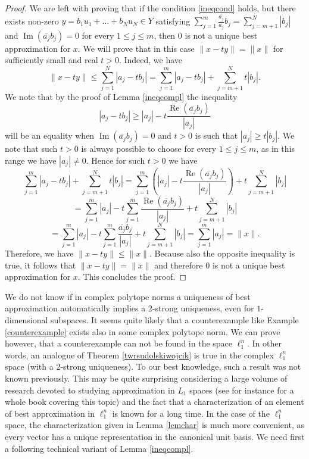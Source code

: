 \documentclass[12pt, reqno]{amsart}
\theoremstyle{definition}
\theoremstyle{remark}
\numberwithin{equation}{section}
\DeclareMathOperator{\re}{Re}
\DeclareMathOperator{\im}{Im}
\begin{document}
\begin{proof}
We are left with proving that if the condition \eqref{ineqcond} holds, but there exists non-zero $y =b_1u_1 + \ldots + b_Nu_N \in Y$ satisfying $\sum_{j=1}^{m} \frac{\overline{a_j}}{a_j} b_j = \sum_{j=m+1}^{N} |b_j|$ and $\im(\overline{a_j}b_j)=0$ for every $1 \leq j \leq m$, then $0$ is not a unique best approximation for $x$. We will prove that in this case $\|x-ty\|=\|x\|$ for sufficiently small and real $t>0$. Indeed, we have
$$\|x-ty\| \leq \sum_{j=1}^{N} |a_j - tb_j| = \sum_{j=1}^{m} |a_j - tb_j| + \sum_{j=m+1}^{N} t|b_j|.$$
We note that by the proof of Lemma \ref{ineqcompl} the inequality 
$$|a_j-tb_j| \geq |a_j| - t\frac{\re\left ( \overline{a_j}b_j \right )}{|a_j|}$$
will be an equality when $\im(\overline{a_j}b_j)=0$ and $t>0$ is such that $|a_j| \geq t|b_j|$. We note that such $t>0$ is always possible to choose for every $1 \leq j \leq m$, as in this range we have $|a_j| \neq 0$. Hence for such $t>0$ we have
$$\sum_{j=1}^{m} |a_j - tb_j| + \sum_{j=m+1}^{N} t|b_j| = \sum_{j=1}^{m} \left ( |a_j| - t\frac{\re\left ( \overline{a_j}b_j \right )}{|a_j|} \right ) + t \sum_{j=m+1}^{N} |b_j|$$
$$=\sum_{j=1}^{m} |a_j| - t \sum_{j=1}^{m} \frac{\re\left ( \overline{a_j}b_j \right )}{|a_j|} + t \sum_{j=m+1}^{N} |b_j|$$
$$=\sum_{j=1}^{m} |a_j| - t \sum_{j=1}^{m} \frac{ \overline{a_j}b_j}{|a_j|} + t \sum_{j=m+1}^{N} |b_j| = \sum_{j=1}^{m} |a_j| = \|x\|.$$
Therefore, we have $\|x-ty\| \leq \|x\|$. Because also the opposite inequality is true, it follows that $\|x-ty\|=\|x\|$ and therefore $0$ is not a unique best approximation for $x$. This concludes the proof.
\end{proof}


We do not know if in complex polytope norms a uniqueness of best approximation automatically implies a $2$-strong uniqueness, even for $1$-dimensional subspaces. It seems quite likely that a counterexample like Example \ref{counterexample} exists also in some complex polytope norm. We can prove however, that a counterexample can not be found in the space $\ell_1^n$. In other words, an analogue of Theorem \ref{twrsudolskiwojcik} is true in the complex $\ell_1^n$ space (with a $2$-strong uniqueness). To our best knowledge, such a result was not known previously. This may be quite surprising considering a large volume of research devoted to studying approximation in $L_1$ spaces (see for instance \cite{l1book} for a whole book covering this topic) and the fact that a characterization of an element of best approximation in $\ell_1^n$ is known for a long time. In the case of the $\ell_1^n$ space, the characterization given in Lemma \ref{lemchar} is much more convenient, as every vector has a unique representation in the canonical unit basis. We need first a following technical variant of Lemma \ref{ineqcompl}.
\end{document}
